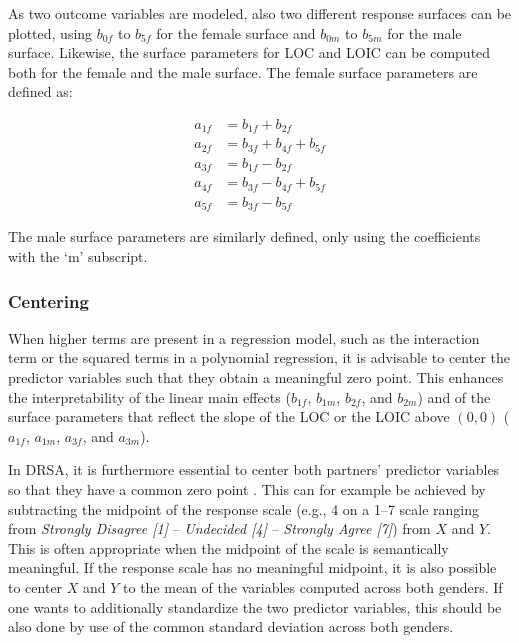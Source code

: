 \documentclass[jou,a4paper,draftfirst]{apa6}
\begin{document}
As two outcome variables are modeled, also two different response surfaces can be plotted, using $b_{0f}$ to $b_{5f}$ for the female surface and $b_{0m}$ to $b_{5m}$ for the male surface. Likewise, the surface parameters for LOC and LOIC can be computed both for the female and the male surface. The female surface parameters are defined as:

\begin{equation} 
\label{eq:female_SP}
\begin{split}
a_{1f} &= b_{1f} + b_{2f}\\
a_{2f} &= b_{3f} + b_{4f} + b_{5f}\\
a_{3f} &= b_{1f} - b_{2f}\\
a_{4f} &= b_{3f} - b_{4f} + b_{5f}\\
a_{5f} &= b_{3f} - b_{5f}
\end{split}
\end{equation}

The male surface parameters are similarly defined, only using the coefficients with the `m' subscript.

\subsubsection{Centering}
When higher terms are present in a regression model, such as the interaction term or the squared terms in a polynomial regression, it is advisable to center the predictor variables such that they obtain a meaningful zero point. This enhances the interpretability of the linear main effects ($b_{1f}$, $b_{1m}$, $b_{2f}$, and $b_{2m}$) and of the surface parameters that reflect the slope of the LOC or the LOIC above $(0,0)$ ($a_{1f}$, $a_{1m}$, $a_{3f}$, and $a_{3m}$).

In DRSA, it is furthermore essential to center both partners' predictor variables so that they have a common zero point \parencite{kenny_partner_1999,kenny_dyadic_2006}. This can for example be achieved by subtracting the midpoint of the response scale (e.g., 4 on a 1--7 scale ranging from \textit{Strongly Disagree [1]} -- \textit{Undecided [4]} -- \textit{Strongly Agree [7]}) from $X$ and $Y$. This is often appropriate when the midpoint of the scale is semantically meaningful.
If the response scale has no meaningful midpoint, it is also possible to center $X$ and $Y$ to the mean of the variables computed across both genders. If one wants to additionally standardize the two predictor variables, this should be also done by use of the common standard deviation across both genders. 
\end{document}

